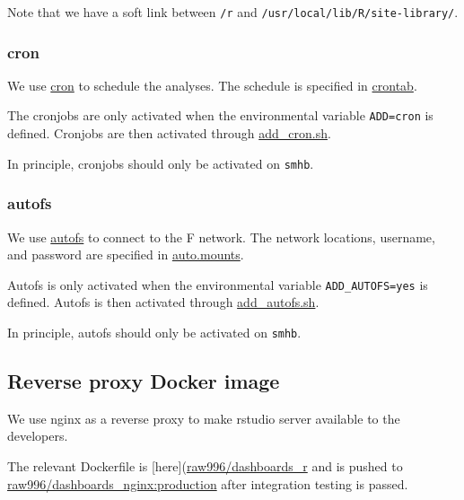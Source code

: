 \documentclass[12pt,]{article}
\begin{document}
Note that we have a soft link between \texttt{/r} and
\texttt{/usr/local/lib/R/site-library/}.

\subsubsection{cron}\label{cron}

We use \href{https://en.wikipedia.org/wiki/Cron}{cron} to schedule the
analyses. The schedule is specified in
\href{https://github.com/raubreywhite/dashboards_control/blob/master/infrastructure/dashboards_r/crontab}{crontab}.

The cronjobs are only activated when the environmental variable
\texttt{ADD=cron} is defined. Cronjobs are then activated through
\href{https://github.com/raubreywhite/dashboards_control/blob/master/infrastructure/dashboards_r/add_cron.sh}{add\_cron.sh}.

In principle, cronjobs should only be activated on \texttt{smhb}.

\subsubsection{autofs}\label{autofs}

We use \href{https://help.ubuntu.com/community/Autofs}{autofs} to
connect to the F network. The network locations, username, and password
are specified in
\href{https://github.com/raubreywhite/dashboards_control/blob/master/infrastructure/dashboards_r/auto.mounts}{auto.mounts}.

Autofs is only activated when the environmental variable
\texttt{ADD\_AUTOFS=yes} is defined. Autofs is then activated through
\href{https://github.com/raubreywhite/dashboards_control/blob/master/infrastructure/dashboards_r/add_autofs.sh}{add\_autofs.sh}.

In principle, autofs should only be activated on \texttt{smhb}.

\subsection{Reverse proxy Docker
image}\label{reverse-proxy-docker-image}

We use nginx as a reverse proxy to make rstudio server available to the
developers.

The relevant Dockerfile is
{[}here{]}(\href{https://github.com/raubreywhite/dashboards_control/blob/master/infrastructure/dashboards_nginx/Dockerfile}{raw996/dashboards\_r}
and is pushed to
\href{https://hub.docker.com/r/raw996/dashboards_nginx/}{raw996/dashboards\_nginx:production}
after integration testing is passed.
\end{document}
